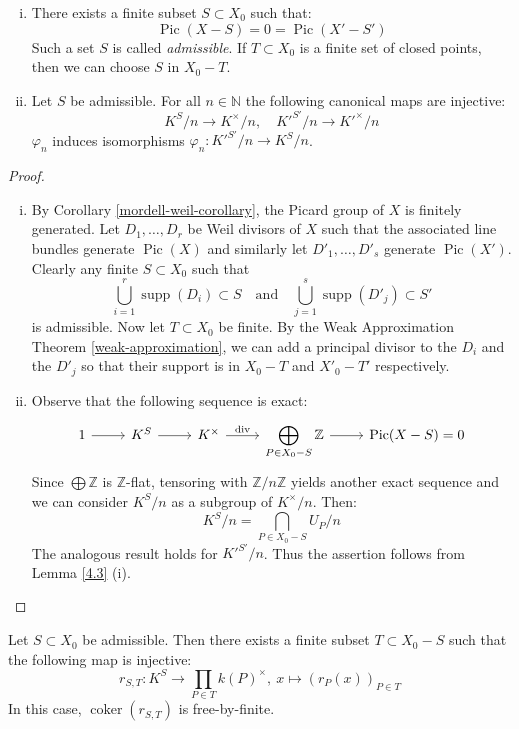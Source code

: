 \begin{lemma}\label{4.5}
\begin{enumerate}[(i)]
\item There exists a finite subset $S\subset X_0$ such that:
\[ \operatorname{Pic}(X -  S)=0=\operatorname{Pic}(X' -  S') \]
Such a set $S$ is called \textit{admissible}. If $T\subset X_0$ is a finite set of closed points, then we can choose $S$ in $X_0 -  T$.
\item Let $S$ be admissible. For all $n\in\mathbb{N}$ the following canonical maps are injective:
\[ K^S/n \to K^\times /n,\quad K'^{S'}/n\to K'^\times /n \]
$\varphi_n$ induces isomorphisms $\varphi_n: K'^{S'}/n\to K^S/n$.
\end{enumerate}
\end{lemma}

\begin{proof}
\begin{enumerate}[(i)]
\item By Corollary \ref{mordell-weil-corollary}, the Picard group of $X$ is finitely generated. Let $D_1,\ldots, D_r$ be Weil divisors of $X$ such that the associated line bundles generate $\operatorname{Pic}(X)$ and similarly let $D'_1,\ldots,D'_s$ generate $\operatorname{Pic}(X')$. Clearly any finite $S\subset X_0$ such that
\[ \bigcup_{i=1}^r \operatorname{supp}(D_i)\subset S\quad\text{and}\quad \bigcup_{j=1}^s\operatorname{supp}(D'_j)\subset S' \]
is admissible. Now let $T\subset X_0$ be finite. By the Weak Approximation Theorem \ref{weak-approximation}, we can add a principal divisor to the $D_i$ and the $D'_j$ so that their support is in $X_0 -  T$ and $X'_0 -  T'$ respectively.
\item Observe that the following sequence is exact:
\[ \begin{tikzcd}
1 \ar[r] & K^S \ar[r]& K^\times \ar[r, "\operatorname{div}"]& \displaystyle \bigoplus_{P\in X_0 -  S}\mathbb{Z} \ar[r]& \operatorname{Pic}(X -  S) = 0
\end{tikzcd} \]
Since $\bigoplus\mathbb{Z}$ is $\mathbb{Z}$-flat, tensoring with $\mathbb{Z}/n\mathbb{Z}$ yields another exact sequence and we can consider $K^S/n$ as a subgroup of $K^\times/n$. Then:
\[ K^S/n = \bigcap_{P\in X_0 -  S}U_P/n \]
The analogous result holds for $K'^{S'}/n$. Thus the assertion follows from Lemma \ref{4.3} (i).\qedhere
\end{enumerate}
\end{proof}

\begin{lemma}\label{5.4}
Let $S\subset X_0$ be admissible. Then there exists a finite subset $T\subset X_0 -  S$ such that the following map is injective:
\[ r_{S,T}:K^S \to\prod_{P\in T}k(P)^\times,\ x\mapsto(r_P(x))_{P\in T} \]
In this case, $\operatorname{coker}(r_{S,T})$ is free-by-finite.
\end{lemma}

